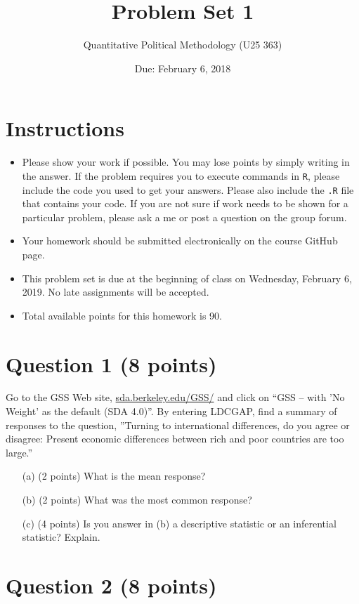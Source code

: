 \documentclass[12pt,letterpaper]{article}
\title{Problem Set 1}
\date{Due: February 6, 2018}
\author{Quantitative Political Methodology (U25 363)}
\begin{document}
	\maketitle
	
	\section*{Instructions}
	\begin{itemize}
		\item Please show your work if possible. You may lose points by simply writing in the answer. If the problem requires you to execute commands in \texttt{R}, please include the code you used to get your answers. Please also include the \texttt{.R} file that contains your code. If you are not sure if work needs to be shown for a particular problem, please ask a me or post a question on the group forum.
		\item Your homework should be submitted electronically on the course GitHub page.
		\item This problem set is due at the beginning of class on Wednesday, February 6, 2019. No late assignments will be accepted.
		\item Total available points for this homework is 90.
	\end{itemize}
	
	
	\section*{Question 1 (8 points)}
	
	Go to the GSS Web site,  \href{http://sda.berkeley.edu/GSS/}{sda.berkeley.edu/GSS/} and click on “GSS – with ’No Weight’ as the default (SDA 4.0)”. By entering LDCGAP, find a summary of responses to the question, ”Turning to international differences, do you agree or disagree: Present economic differences between rich and poor countries are too large.”
	\begin{itemize}
		\item[(a)] (2 points) What is the mean response?
		\item[(b)] (2 points) What was the most common response?
		\item[(c)] (4 points) Is you answer in (b) a descriptive statistic or an inferential statistic? Explain.
	\end{itemize}
	
	\section*{Question 2 (8 points)}
	
\end{document}
